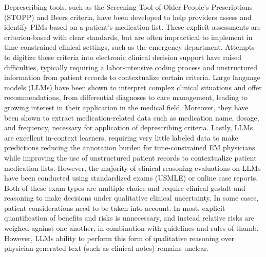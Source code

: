 Deprescribing tools, such as the Screening Tool of Older People's Prescriptions (STOPP)\citep{omahonySTOPPSTARTCriteria2023} and Beers\citep{bythe2023americangeriatricssocietybeerscriteriarupdateexpertpanelAmericanGeriatricsSociety2023} criteria, have been developed to help providers assess and identify PIMs based on a patient's medication list\citep{candeiasPotentiallyInappropriateMedications2021,kaufmannInappropriatePrescribingSystematic2014}. These explicit assessments are criterion-based with clear standards, but are often impractical to implement in time-constrained clinical settings, such as the emergency department\citep{leeChallengesOpportunitiesCreating2022}. Attempts to digitize these criteria into electronic clinical decision support have raised difficulties, typically requiring a labor-intensive coding process and unstructured information from patient records to contextualize certain criteria\citep{anrysSTOPPSTARTVersion2016b, scottUsingEMRenabledComputerized2018}. Large language models (LLMs) have been shown to interpret complex clinical situations and offer recommendations, from differential diagnoses to care management, leading to growing interest in their application in the medical field\citep{clusmannFutureLandscapeLarge2023, gilsonHowDoesChatGPT2023, kungPerformanceChatGPTUSMLE2023, savageDiagnosticReasoningPrompts2024}. Moreover, they have been shown to extract medication-related data such as medication name, dosage, and frequency, necessary for application of deprescribing criteria\citep{goelLLMsAccelerateAnnotation2023}. Lastly, LLMs are excellent in-context learners, requiring very little labeled data to make predictions\citep{agrawal-etal-2022-large} reducing the annotation burden for time-constrained EM physicians while improving the use of unstructured patient records to contextualize patient medication lists. However, the majority of clinical reasoning evaluations on LLMs have been conducted using standardized exams (USMLE) or online case reports\citep{savageDiagnosticReasoningPrompts2024, savageLargeLanguageModel2024}. Both of these exam types are multiple choice and require clinical gestalt and reasoning to make decisions under  qualitative clinical uncertainty. In some cases, patient considerations need to be taken into account. In most, explicit quantification of benefits and risks is unnecessary, and instead relative risks are weighed against one another, in combination with guidelines and rules of thumb. However, LLMs ability to perform this form of qualitative reasoning over physician-generated text (such as clinical notes) remains unclear.  

